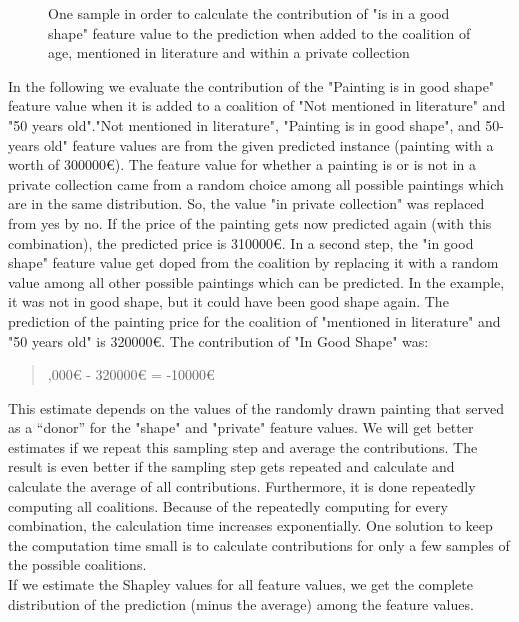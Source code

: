 \begin{figure}[!htp]
	\centering
	\caption{One sample in order to calculate the contribution of "is in a good shape" feature value to the prediction when added to the coalition of age, mentioned in literature and within a private collection }
	\label{fig:shapley_values_example_01}
\end{figure}

In the following  we evaluate the contribution of the "Painting is in good shape" feature value when it is added to a coalition of "Not mentioned in literature" and "50 years old"."Not mentioned in literature", "Painting is in good shape", and 50-years old" feature values are from the given predicted instance (painting with a worth of 300000€). The feature value for whether a painting is or is not in a private collection came from a random choice among all possible paintings which are in the same distribution. So, the value "in private collection" was replaced from yes by no. If the price of the painting gets now predicted again (with this combination), the predicted price is 310000€. In a second step, the "in good shape" feature value get doped from the coalition by replacing it with a random value among all other possible paintings which can be predicted. In the example, it was not in good shape, but it could have been good shape again. The prediction of the painting price for the coalition of "mentioned in literature" and "50 years old" is 320000€. The contribution of "In Good Shape" was:

\begin{quote}
	,000€ - 320000€ = -10000€
\end{quote} 

This estimate depends on the values of the randomly drawn painting that served as a “donor” for the "shape" and "private" feature values. We will get better estimates if we repeat this sampling step and average the contributions. The result is even better if the sampling step gets repeated and calculate and calculate the average of all contributions. Furthermore, it is done repeatedly computing all coalitions. Because of the repeatedly computing for every combination, the calculation time increases exponentially. One solution to keep the computation time small is to calculate contributions for only a few samples of the possible coalitions.\\

If we estimate the Shapley values for all feature values, we get the complete distribution of the prediction (minus the average) among the feature values.

